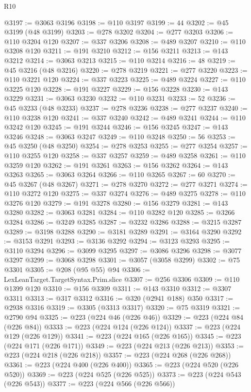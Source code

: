 \begin{lexlean}{R10}
\begin{coremodule}
@3197 := @3063 @3196
@3198 := @110 @3197
@3199 := 44
@3202 := @45 @3199 (@48 @3199)
@3203 := @278 @3202
@3204 := @277 @3203
@3206 := @110 @3204 @120
@3207 := @337 @3206
@3208 := @489 @3207
@3210 := @110 @3208 @120
@3211 := @191 @3210
@3212 := @156 @3211
@3213 := @143 @3212
@3214 := @3063 @3213
@3215 := @110 @3214
@3216 := 48
@3219 := @45 @3216 (@48 @3216)
@3220 := @278 @3219
@3221 := @277 @3220
@3223 := @110 @3221 @120
@3224 := @337 @3223
@3225 := @489 @3224
@3227 := @110 @3225 @120
@3228 := @191 @3227
@3229 := @156 @3228
@3230 := @143 @3229
@3231 := @3063 @3230
@3232 := @110 @3231
@3233 := 52
@3236 := @45 @3233 (@48 @3233)
@3237 := @278 @3236
@3238 := @277 @3237
@3240 := @110 @3238 @120
@3241 := @337 @3240
@3242 := @489 @3241
@3244 := @110 @3242 @120
@3245 := @191 @3244
@3246 := @156 @3245
@3247 := @143 @3246
@3248 := @3063 @3247
@3249 := @110 @3248
@3250 := 56
@3253 := @45 @3250 (@48 @3250)
@3254 := @278 @3253
@3255 := @277 @3254
@3257 := @110 @3255 @120
@3258 := @337 @3257
@3259 := @489 @3258
@3261 := @110 @3259 @120
@3262 := @191 @3261
@3263 := @156 @3262
@3264 := @143 @3263
@3265 := @3063 @3264
@3266 := @110 @3265
@3267 := 60
@3270 := @45 @3267 (@48 @3267)
@3271 := @278 @3270
@3272 := @277 @3271
@3274 := @110 @3272 @120
@3275 := @337 @3274
@3276 := @489 @3275
@3278 := @110 @3276 @120
@3279 := @191 @3278
@3280 := @156 @3279
@3281 := @143 @3280
@3282 := @3063 @3281
@3284 := @110 @3282 @120
@3285 := @3266 @3284
@3286 := @3249 @3285
@3287 := @3232 @3286
@3288 := @3215 @3287
@3289 := @3198 @3288
@3290 := @3181 @3289
@3291 := @3164 @3290
@3292 := @3153 @3291
@3293 := @3136 @3292
@3294 := @3123 @3293
@3295 := @3110 @3294
@3296 := @3099 @3295
@3297 := @3086 @3296
@3298 := @3077 @3297
@3299 := @3068 @3298
@3301 := @3057 (@3058 @3299)
@3302 := @75 @3301
@3305 := @208 (@95 @55) @94
@3306 := LexLeanTarget.TargetSyntax.Prim.slice
@3307 := @256 @3306
@3309 := @110 @1399 @120
@3310 := @156 @3309
@3311 := @143 @3310
@3312 := @3307 @3311
@3313 := @317 @3312
@3316 := @320 (@2941 @188) @350
@3317 := @2938 @3316
@3319 := @3305 (@3313 @3317)
@3320 := @75 @3319
@3321 := @2790 @94
@3325 := @223 (@224 @46 (@226 @46))
@3329 := @223 (@224 @84 (@226 @84))
@3333 := @223 (@224 @124 (@226 @124))
@3337 := @223 (@224 @129 (@226 @129))
@3341 := @223 (@224 @165 (@226 @165))
@3345 := @223 (@224 @171 (@226 @171))
@3349 := @223 (@224 @213 (@226 @213))
@3353 := @223 (@224 @218 (@226 @218))
@3357 := @223 (@224 @268 (@226 @268))
@3361 := @223 (@224 @400 (@226 @400))
@3365 := @223 (@224 @520 (@226 @520))
@3369 := @223 (@224 @525 (@226 @525))
@3373 := @223 (@224 @543 (@226 @543))
@3377 := @223 (@224 @566 (@226 @566))

\end{coremodule}
\end{lexlean}

